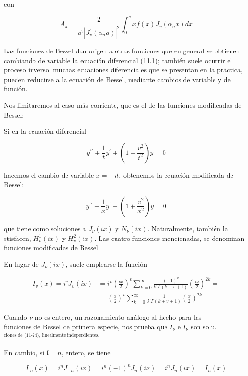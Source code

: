 \documentclass[10pt]{article}
\theoremstyle{plain}
\theoremstyle{definition}
\theoremstyle{remark}
\begin{document}
con

$$
A_{n}=\frac{2}{a^{2}\left|J_{v}^{\prime}\left(\alpha_{n} a\right)\right|^{2}} \int_{0}^{a} x f(x) J_{v}\left(\alpha_{n} x\right) d x
$$

Las funciones de Bessel dan origen a otras funciones que en general se obtienen cambiando de variable la ecuación diferencial (11.1); también suele ocurrir el proceso inverso: muchas ecuaciones diferenciales que se presentan en la práctica, pueden reducirse a la ecuación de Bessel, mediante cambios de variable y de función.

Nos limitaremos al caso más corriente, que es el de las funciones modificadas de Bessel:

Si en la ecuación diferencial

$$
y^{\prime \prime}+\frac{1}{t} y^{\prime}+\left(1-\frac{v^{2}}{t^{2}}\right) y=0
$$

hacemos el cambio de variable $x=-i t$, obtenemos la ecuación modificada de Bessel:


\begin{equation*}
y^{\prime \prime}+\frac{1}{x} y^{\prime}-\left(1+\frac{v^{2}}{x^{2}}\right) y=0 \tag{11-24}
\end{equation*}


que tiene como soluciones a $J_{\nu}(i x)$ y $N_{\nu}(i x)$. Naturalmente, también la stisfacen, $H_{v}^{1}(i x)$ y $H_{v}^{2}(i x)$. Las cuatro funciones mencionadas, se denominan funciones modificadas de Bessel.

En lugar de $J_{\nu}(i x)$, suele emplearse la función

$$
\begin{aligned}
I_{v}(x)=i^{v} J_{v}(i x) & =i^{v}\left(\frac{i x}{2}\right)^{v} \sum_{k=0}^{\infty} \frac{(-1)^{k}}{k!\Gamma(k+v+1)}\left(\frac{i x}{2}\right)^{2 k}= \\
& =\left(\frac{x}{2}\right)^{v} \sum_{k=0}^{\infty} \frac{1}{k!\Gamma(k+v+1)}\left(\frac{x}{2}\right)^{2 k}
\end{aligned}
$$

Cuando $\nu$ no es entero, un razonamiento análogo al hecho para las\\
funciones de Bessel de primera especie, nos prueba que $I_{\nu}$ e $I_{\nu}$ son solu. ${ }^{\text {ciones de (11-24), linealmente independientes. }}$

En cambio, si $\mathfrak{l}=n$, entero, se tiene

$$
I_{\cdot n}(x)=i^{n} J_{-n}(i x)=i^{n}(-1)^{n} J_{n}(i x)=i^{n} J_{n}(i x)=I_{n}(x)
$$
\end{document}
